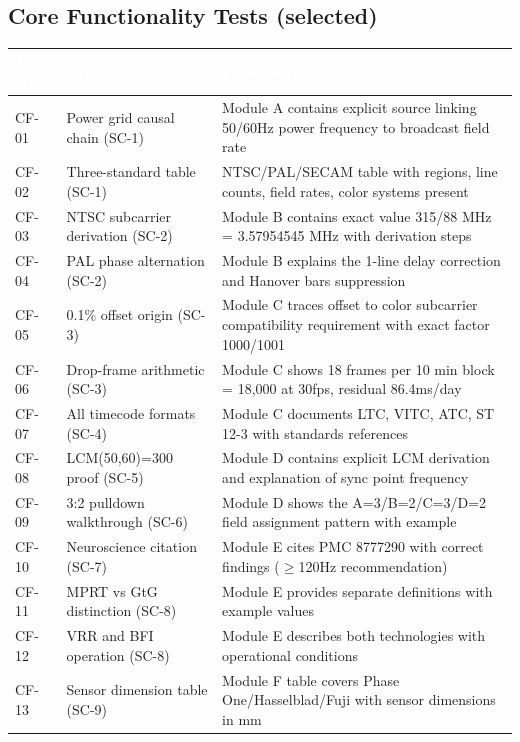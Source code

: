 \documentclass[11pt,letterpaper]{article}
\newcommand{\tableheader}[1]{\textbf{\sffamily\textcolor{white}{#1}}}
\begin{document}
\subsection{Core Functionality Tests (selected)}

\begin{center}
\begin{tabularx}{\textwidth}{L{1.5cm}L{3.5cm}X}
\toprule
{}
\tableheader{Test ID} & \tableheader{Verifies} & \tableheader{Expected Behavior} \\
\midrule
CF-01 & Power grid causal chain (SC-1) & Module A contains explicit source linking 50/60Hz power frequency to broadcast field rate \\
CF-02 & Three-standard table (SC-1) & NTSC/PAL/SECAM table with regions, line counts, field rates, color systems present \\
CF-03 & NTSC subcarrier derivation (SC-2) & Module B contains exact value 315/88 MHz = 3.57954545 MHz with derivation steps \\
CF-04 & PAL phase alternation (SC-2) & Module B explains the 1-line delay correction and Hanover bars suppression \\
CF-05 & 0.1\% offset origin (SC-3) & Module C traces offset to color subcarrier compatibility requirement with exact factor 1000/1001 \\
CF-06 & Drop-frame arithmetic (SC-3) & Module C shows 18 frames per 10 min block = 18,000 at 30fps, residual 86.4ms/day \\
CF-07 & All timecode formats (SC-4) & Module C documents LTC, VITC, ATC, ST 12-3 with standards references \\
CF-08 & LCM(50,60)=300 proof (SC-5) & Module D contains explicit LCM derivation and explanation of sync point frequency \\
CF-09 & 3:2 pulldown walkthrough (SC-6) & Module D shows the A=3/B=2/C=3/D=2 field assignment pattern with example \\
CF-10 & Neuroscience citation (SC-7) & Module E cites PMC 8777290 with correct findings ($\geq$120Hz recommendation) \\
CF-11 & MPRT vs GtG distinction (SC-8) & Module E provides separate definitions with example values \\
CF-12 & VRR and BFI operation (SC-8) & Module E describes both technologies with operational conditions \\
CF-13 & Sensor dimension table (SC-9) & Module F table covers Phase One/Hasselblad/Fuji with sensor dimensions in mm \\

\end{tabularx}
\end{center}
\end{document}
